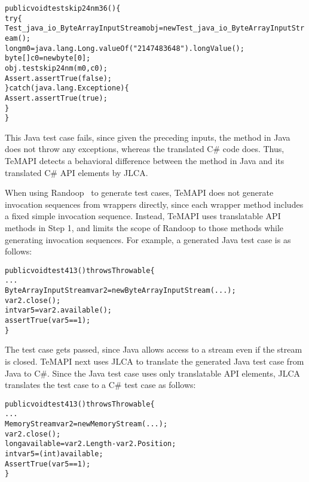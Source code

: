 \begin{CodeOut}%
\begin{alltt}
public void testskip24nm36()\{
  try\{
     Test_java_io_ByteArrayInputStream obj = new Test_java_io_ByteArrayInputStream();
     long m0 = java.lang.Long.valueOf("2147483648").longValue();
     byte[] c0 = new byte[0];
     obj.testskip24nm(m0,c0);
     Assert.assertTrue(false);
  \}catch(java.lang.Exception e)\{
     Assert.assertTrue(true);
  \}
\}
\end{alltt}
\end{CodeOut}%

This Java test case fails, since given the preceding inputs, the  method in Java does not throw any exceptions, whereas the translated C\# code does. Thus, TeMAPI detects a behavioral difference between the  method in Java and its translated C\# API elements by JLCA.

When using Randoop~\cite{pacheco2007feedback} to generate test cases, TeMAPI does not generate invocation sequences from wrappers directly, since each wrapper method includes a fixed simple invocation sequence. Instead, TeMAPI uses translatable API methods in Step 1, and limits the scope of Randoop to those methods while generating invocation sequences. For example, a generated Java test case is as follows:

\begin{CodeOut}%
\begin{alltt}
public void test413() throws Throwable \{
  ...
  ByteArrayInputStream var2 = new ByteArrayInputStream(...);
  var2.close();
  int var5 = var2.available();
  assertTrue(var5 == 1);
\}
\end{alltt}
\end{CodeOut}%


The test case gets passed, since Java allows access to a stream even if the stream is closed. TeMAPI next uses JLCA to translate the generated Java test case from Java to C\#. Since the Java test case uses only translatable API elements, JLCA translates the test case to a C\# test case as follows:

\begin{CodeOut}%
\begin{alltt}
public void test413() throws Throwable\{
  ...
  MemoryStream var2 = new MemoryStream(...);
  var2.close();
  long available = var2.Length - var2.Position;
  int var5 = (int) available;
  AssertTrue(var5 == 1);
\}
\end{alltt}
\end{CodeOut}%

